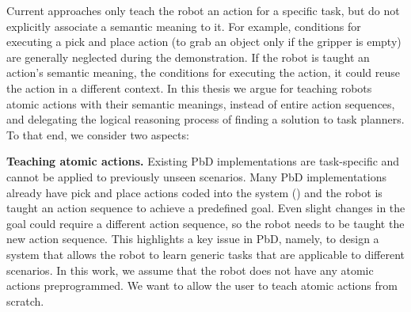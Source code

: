 Current approaches only teach the robot an action for a specific task, but do not explicitly associate a semantic meaning to it.
For example, conditions for executing a pick and place action (\eg to grab an object only if the gripper is empty) are generally neglected during the demonstration.
If the robot is taught an action's semantic meaning, \ie the conditions for executing the action, it could reuse the action in a different context.
In this thesis we argue for teaching robots atomic actions with their semantic meanings, instead of entire action sequences, and delegating the logical reasoning process of finding a solution to task planners.
To that end, we consider two aspects:

\textbf{Teaching atomic actions.}
Existing PbD implementations are task-specific and cannot be applied to previously unseen scenarios.
Many PbD implementations already have pick and place actions coded into the system (\cite{veeraraghavan2008teaching}) and the robot is taught an action sequence to achieve a predefined goal.
Even slight changes in the goal could require a different action sequence, so the robot needs to be taught the new action sequence.
This highlights a key issue in PbD, namely, to design a system that allows the robot to learn  generic tasks that are applicable to different scenarios.
In this work, we assume that the robot does not have any atomic actions preprogrammed.
We want to allow the user to teach atomic actions from scratch.

